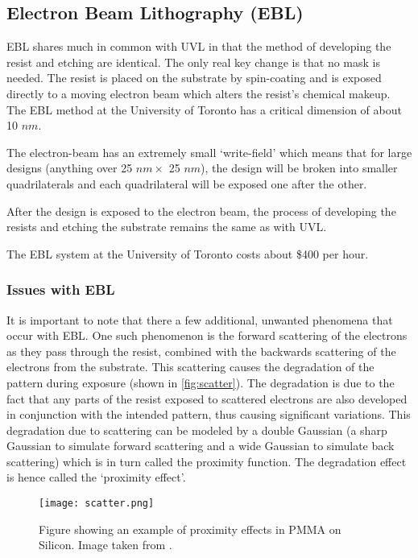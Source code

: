\subsection{Electron Beam Lithography (EBL)}

EBL shares much in common with UVL in that the method of developing the resist and etching are identical. The only real key change is that no mask is needed. The resist is placed on the substrate by spin-coating and is exposed directly to a moving electron beam which alters the resist's chemical makeup. The EBL method at the University of Toronto has a critical dimension of about 10 $nm$.

The electron-beam has an extremely small `write-field' which means that for large designs (anything over 25 $nm \times$ 25 $nm$), the design will be broken into smaller quadrilaterals and each quadrilateral will be exposed one after the other. 

After the design is exposed to the electron beam, the process of developing the resists and etching the substrate remains the same as with UVL. 

The EBL system at the University of Toronto costs about \$400 per hour.

\subsubsection{Issues with EBL}

It is important to note that there a few additional, unwanted phenomena that occur with EBL. One such phenomenon is the forward scattering of the electrons as they pass through the resist, combined with the backwards scattering of the electrons from the substrate. This scattering causes the degradation of the pattern during exposure (shown in \autoref{fig:scatter}). The degradation is due to the fact that any parts of the resist exposed to scattered electrons are also developed in conjunction with the intended pattern, thus causing significant variations. This degradation due to scattering can be modeled by a double Gaussian \cite{chang} (a sharp Gaussian to simulate forward scattering and a wide Gaussian to simulate back scattering) which is in turn called the proximity function. The degradation effect is hence called the `proximity effect'. 

\begin{figure}
\centering
\texttt{[image: scatter.png]}
\caption{Figure showing an example of proximity effects in PMMA on Silicon. Image taken from \cite{kyser}.}
\label{fig:scatter}
\end{figure}

